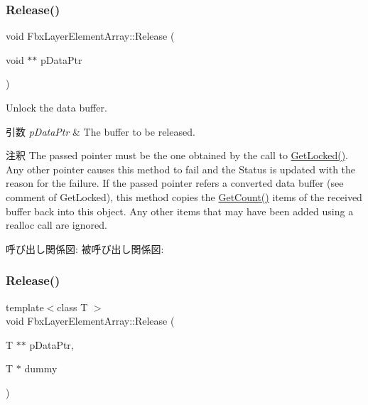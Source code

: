 \subsubsection{\texorpdfstring{Release()}{Release()}\hspace{0.1cm}{\footnotesize\ttfamily [2/3]}}
{\footnotesize\ttfamily void Fbx\+Layer\+Element\+Array\+::\+Release (\begin{DoxyParamCaption}\item[{void $\ast$$\ast$}]{p\+Data\+Ptr }\end{DoxyParamCaption})}

Unlock the data buffer. 
\begin{DoxyParams}{引数}
{\em p\+Data\+Ptr} & The buffer to be released. \\
\hline
\end{DoxyParams}
\begin{DoxyRemark}{注釈}
The passed pointer must be the one obtained by the call to \hyperlink{class_fbx_layer_element_array_a34ac50b866b0615109329c114e612b83}{Get\+Locked()}. Any other pointer causes this method to fail and the Status is updated with the reason for the failure. If the passed pointer refers a converted data buffer (see comment of Get\+Locked), this method copies the \hyperlink{class_fbx_layer_element_array_acd195095246f6d886d55fd0aa7129b2d}{Get\+Count()} items of the received buffer back into this object. Any other items that may have been added using a realloc call are ignored. 
\end{DoxyRemark}
呼び出し関係図\+:
被呼び出し関係図\+:
\mbox{\label{class_fbx_layer_element_array_a1d83bb3361cec99c394596a6bee95bb2}} 
\subsubsection{\texorpdfstring{Release()}{Release()}\hspace{0.1cm}{\footnotesize\ttfamily [3/3]}}
{\footnotesize\ttfamily template$<$class T $>$ \\
void Fbx\+Layer\+Element\+Array\+::\+Release (\begin{DoxyParamCaption}\item[{T $\ast$$\ast$}]{p\+Data\+Ptr,  }\item[{T $\ast$}]{dummy }\end{DoxyParamCaption})}

